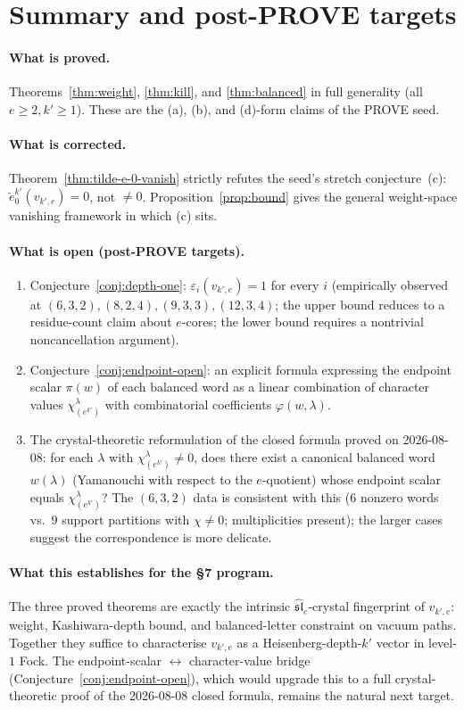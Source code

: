 \documentclass[11pt]{article}
\theoremstyle{definition}
\newcommand{\slh}{\widehat{\mathfrak{sl}}}
\newcommand{\te}{\tilde e}
\newcommand{\eps}{\varepsilon}
\begin{document}
\section{Summary and post-PROVE targets}

\paragraph{What is proved.} Theorems~\ref{thm:weight}, \ref{thm:kill}, and
\ref{thm:balanced} in full generality (all $e\ge 2, k'\ge 1$). These are the (a), (b),
and (d)-form claims of the PROVE seed.

\paragraph{What is corrected.} Theorem~\ref{thm:tilde-e-0-vanish} strictly refutes the
seed's stretch conjecture~(c): $\te_0^{k'}(v_{k',e}) = 0$, not $\ne 0$.
Proposition~\ref{prop:bound} gives the general weight-space vanishing framework in
which (c) sits.

\paragraph{What is open (post-PROVE targets).}
\begin{enumerate}
  \item Conjecture~\ref{conj:depth-one}: $\eps_i(v_{k',e}) = 1$ for every $i$
   (empirically observed at $(6,3,2), (8,2,4), (9,3,3), (12,3,4)$; the upper bound
   reduces to a residue-count claim about $e$-cores; the lower bound requires a nontrivial
   noncancellation argument).
  \item Conjecture~\ref{conj:endpoint-open}: an explicit formula expressing the
   endpoint scalar $\pi(w)$ of each balanced word as a linear combination of
   character values $\chi^\lambda_{(e^{k'})}$ with combinatorial coefficients
   $\varphi(w,\lambda)$.
  \item The crystal-theoretic reformulation of the closed formula proved on 2026-08-08:
   for each $\lambda$ with $\chi^\lambda_{(e^{k'})}\ne 0$, does there exist a canonical
   balanced word $w(\lambda)$ (Yamanouchi with respect to the $e$-quotient) whose
   endpoint scalar equals $\chi^\lambda_{(e^{k'})}$? The $(6,3,2)$ data is consistent with
   this ($6$ nonzero words vs.\ $9$ support partitions with $\chi \ne 0$; multiplicities
   present); the larger cases suggest the correspondence is more delicate.
\end{enumerate}

\paragraph{What this establishes for the §7 program.}
The three proved theorems are exactly the intrinsic $\slh_e$-crystal fingerprint of
$v_{k',e}$: weight, Kashiwara-depth bound, and balanced-letter constraint on vacuum
paths. Together they suffice to characterise $v_{k',e}$ as a Heisenberg-depth-$k'$
vector in level-$1$ Fock. The endpoint-scalar $\leftrightarrow$ character-value bridge
(Conjecture~\ref{conj:endpoint-open}), which would upgrade this to a full crystal-theoretic
proof of the 2026-08-08 closed formula, remains the natural next target.
\end{document}

